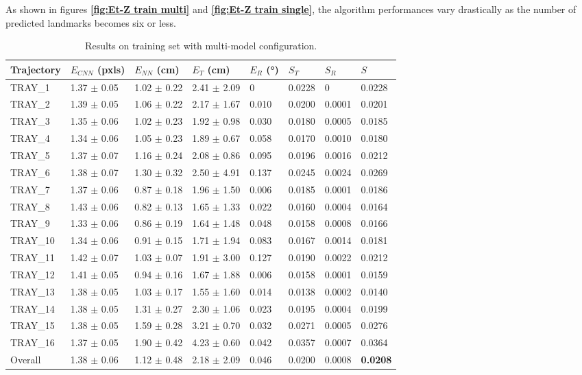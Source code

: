\newpage
As shown in figures \textbf{\ref{fig:Et-Z train multi}} and \textbf{\ref{fig:Et-Z train single}}, the algorithm performances vary drastically as the number of predicted landmarks becomes six or less.\\
\begin{table}[H]
\centering
\begin{tabular}{l | l l l l | l l | l}
\toprule
Trajectory & $E_{CNN}$ (pxls) & $E_{NN}$ (cm) & $E_T$ (cm)& $E_R$ (°)& $S_T$ & $S_R$ & $S$\\
\midrule
TRAY\_1 & 1.37 $\pm$ 0.05 & 1.02 $\pm$ 0.22 & 2.41 $\pm$ 2.09 & 0 & 0.0228 & 0 & 0.0228\\
\midrule
TRAY\_2 & 1.39 $\pm$ 0.05 & 1.06 $\pm$ 0.22 & 2.17 $\pm$ 1.67 & 0.010 & 0.0200 & 0.0001 & 0.0201\\
TRAY\_3 & 1.35 $\pm$ 0.06 & 1.02 $\pm$ 0.23 & 1.92 $\pm$ 0.98 & 0.030 & 0.0180 & 0.0005 & 0.0185\\
TRAY\_4 & 1.34 $\pm$ 0.06 & 1.05 $\pm$ 0.23 & 1.89 $\pm$ 0.67 & 0.058 & 0.0170 & 0.0010 & 0.0180\\
TRAY\_5 & 1.37 $\pm$ 0.07 & 1.16 $\pm$ 0.24 & 2.08 $\pm$ 0.86 & 0.095 & 0.0196 & 0.0016 & 0.0212\\
TRAY\_6 & 1.38 $\pm$ 0.07 & 1.30 $\pm$ 0.32 & 2.50 $\pm$ 4.91 & 0.137 & 0.0245 & 0.0024 & 0.0269\\
\midrule
TRAY\_7 & 1.37 $\pm$ 0.06 & 0.87 $\pm$ 0.18 & 1.96 $\pm$ 1.50 & 0.006 & 0.0185 & 0.0001 & 0.0186\\
TRAY\_8 & 1.43 $\pm$ 0.06 & 0.82 $\pm$ 0.13 & 1.65 $\pm$ 1.33 & 0.022 & 0.0160 & 0.0004 & 0.0164\\
TRAY\_9 & 1.33 $\pm$ 0.06 & 0.86 $\pm$ 0.19 & 1.64 $\pm$ 1.48 & 0.048 & 0.0158 & 0.0008 & 0.0166\\
TRAY\_10 & 1.34 $\pm$ 0.06 & 0.91 $\pm$ 0.15 & 1.71 $\pm$ 1.94 & 0.083 & 0.0167 & 0.0014 & 0.0181\\
TRAY\_11 & 1.42 $\pm$ 0.07 & 1.03 $\pm$ 0.07 & 1.91 $\pm$ 3.00 & 0.127 & 0.0190 & 0.0022 & 0.0212\\
\midrule
TRAY\_12 & 1.41 $\pm$ 0.05 & 0.94 $\pm$ 0.16 & 1.67 $\pm$ 1.88 & 0.006 & 0.0158 & 0.0001 & 0.0159\\
TRAY\_13 & 1.38 $\pm$ 0.05 & 1.03 $\pm$ 0.17 & 1.55 $\pm$ 1.60 & 0.014 & 0.0138 & 0.0002 & 0.0140\\
TRAY\_14 & 1.38 $\pm$ 0.05 & 1.31 $\pm$ 0.27 & 2.30 $\pm$ 1.06 & 0.023 & 0.0195 & 0.0004 & 0.0199\\
TRAY\_15 & 1.38 $\pm$ 0.05 & 1.59 $\pm$ 0.28 & 3.21 $\pm$ 0.70 & 0.032 & 0.0271 & 0.0005 & 0.0276\\
TRAY\_16 & 1.37 $\pm$ 0.05 & 1.90 $\pm$ 0.42 & 4.23 $\pm$ 0.60 & 0.042 & 0.0357 & 0.0007 & 0.0364\\
\midrule
Overall & 1.38 $\pm$ 0.06 & 1.12 $\pm$ 0.48 & 2.18 $\pm$ 2.09 & 0.046 & 0.0200 & 0.0008 & \textbf{0.0208}\\
\bottomrule
\end{tabular}
\caption{Results on training set with multi-model configuration.}
\label{tab:ResMultiTrain}
\end{table}
